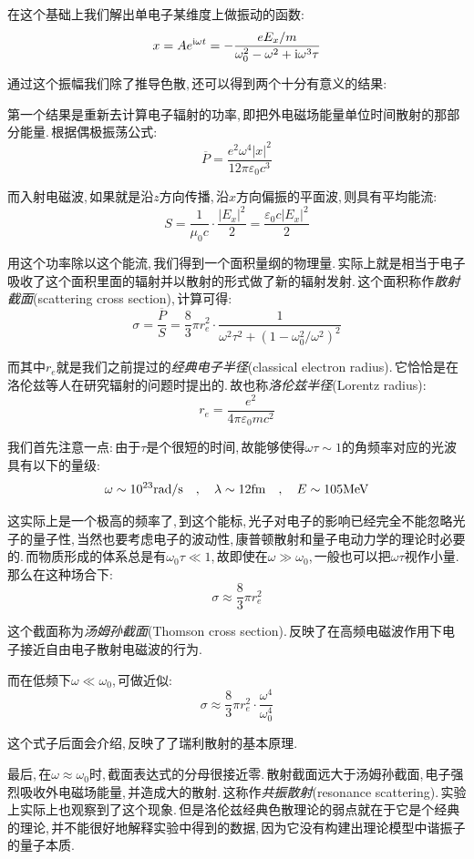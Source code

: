 在这个基础上我们解出单电子某维度上做振动的函数:
\[x=Ae^{{\rm i} \omega t}=-\frac{eE_x/m}{\omega_0^2-\omega^2+{\rm i} \omega^3\tau}\]

通过这个振幅我们除了推导色散,\,还可以得到两个十分有意义的结果:

第一个结果是重新去计算电子辐射的功率,\,即把外电磁场能量单位时间散射的那部分能量.\,根据偶极振荡公式:
\[\overline{P}=\frac{e^2\omega^4|x|^2}{12\pi\varepsilon_0c^3}\]

而入射电磁波,\,如果就是沿$z$方向传播,\,沿$x$方向偏振的平面波,\,则具有平均能流:
\[S=\frac{1}{\mu_0 c}\cdot\frac{|E_x|^2}{2}=\frac{\varepsilon_0c|E_x|^2}{2}\]

用这个功率除以这个能流,\,我们得到一个面积量纲的物理量.\,实际上就是相当于电子吸收了这个面积里面的辐射并以散射的形式做了新的辐射发射.\,这个面积称作\emph{散射截面}(scattering cross section),\,计算可得:
\[\sigma=\frac{\overline{P}}{S}=\frac{8}{3}\pi r_e^2 \cdot \frac{1}{\omega^2\tau^2 +(1-\omega_0^2/\omega^2)^2}\]

而其中$r_e$就是我们之前提过的\emph{经典电子半径}(classical electron radius).\,它恰恰是在洛伦兹等人在研究辐射的问题时提出的.\,故也称\emph{洛伦兹半径}(Lorentz radius):
\[r_e=\frac{e^2}{4\pi\varepsilon_0mc^2}\]

我们首先注意一点:\,由于$\tau$是个很短的时间,\,故能够使得$\omega\tau \sim 1$的角频率对应的光波具有以下的量级:
\[\omega\sim 10^{23}{\rm rad/s}\quad ,\quad \lambda\sim 12{\rm fm}\quad ,\quad E\sim 105{\rm MeV}\]

这实际上是一个极高的频率了,\,到这个能标,\,光子对电子的影响已经完全不能忽略光子的量子性,\,当然也要考虑电子的波动性,\,康普顿散射和量子电动力学的理论时必要的.\,而物质形成的体系总是有$\omega_0\tau\ll 1$,\,故即使在$\omega\gg \omega_0$,\,一般也可以把$\omega\tau$视作小量.\,那么在这种场合下:
\[\sigma \approx \frac{8}{3}\pi r_e^2\]

这个截面称为\emph{汤姆孙截面}(Thomson cross section).\,反映了在高频电磁波作用下电子接近自由电子散射电磁波的行为.

而在低频下$\omega\ll \omega_0$,\,可做近似:
\[\sigma \approx \frac{8}{3}\pi r_e^2\cdot \frac{\omega^4}{\omega_0^4}\]

这个式子后面会介绍,\,反映了了瑞利散射的基本原理.

最后,\,在$\omega\approx \omega_0$时,\,截面表达式的分母很接近零.\,散射截面远大于汤姆孙截面,\,电子强烈吸收外电磁场能量,\,并造成大的散射.\,这称作\emph{共振散射}(resonance scattering).\,实验上实际上也观察到了这个现象.\,但是洛伦兹经典色散理论的弱点就在于它是个经典的理论,\,并不能很好地解释实验中得到的数据,\,因为它没有构建出理论模型中谐振子的量子本质.

